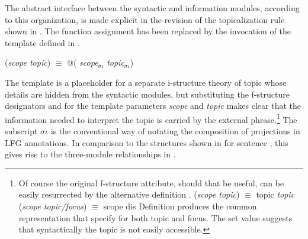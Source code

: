 \documentclass[output=paper,hidelinks]{langscibook}
\begin{document}
The abstract interface between the syntactic and information modules, according to this organization, is made explicit in the revision of the topicalization rule  shown in .  The \TOPIC function assignment has been replaced by the invocation of the \TOPIC template defined in  \citep[for more on the explanatory value of templates, see the discussion in][]{dalrymple2004linguistic}.

\ea \label{istopic}
\ea\label{itopicrule}
  \ex\label{topictemplate}
     (\textit{scope topic}) $\equiv$ {\small @}( \textit{scope}$_{\sigma\iota}$ \textit{topic}$_{\sigma\iota}$)
\z\z

\noindent The template  is a placeholder for a separate i-structure theory of topic  whose details are hidden from the syntactic modules, but substituting the f-struc\-ture designators \UP and \DOWN for the template parameters \textit{scope} and \textit{topic} makes clear that the information needed to interpret the topic is carried by the external phrase.\footnote{Of course the original f-structure \TOPIC attribute, should that be useful, can be easily resurrected by the alternative definition .
\ea\label{oldtopic}(\textit{scope topic}) $\equiv$  {topic} {\textit{topic}}
\z
\ea\label{olddis}(\textit{scope topic/focus}) $\equiv$  {scope} {dis}
\z
\noindent Definition  produces the common  representation that \citet{DLM:LFG} specify for both topic and focus. The set value suggests that syntactically the topic is not easily accessible. 
} The subscript $\sigma\iota$ is the conventional way of notating the composition of projections in LFG annotations. In comparison to the structures shown in  for sentence , this gives rise to the three-module relationships in .  
\end{document}
